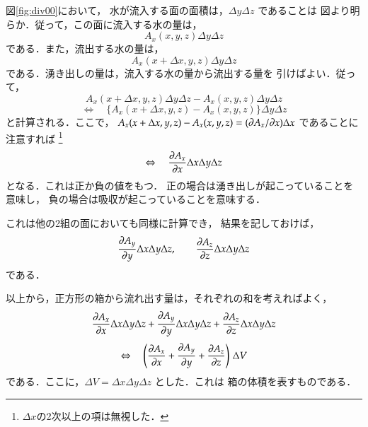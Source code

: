         図\ref{fig:div00}において，
        水が流入する面の面積は，$\Delta y\Delta z$ であることは
        図より明らか．従って，この面に流入する水の量は，
            \begin{equation*}
                A_{x}(x, y, z)\Delta y\Delta z
            \end{equation*}
        である．また，流出する水の量は，
            \begin{equation*}
                A_{x}(x+\Delta x, y, z)\Delta y\Delta z
            \end{equation*}
        である．湧き出しの量は，流入する水の量から流出する量を
        引けばよい．従って，
            \begin{equation*}
                A_{x}(x+\Delta x, y, z)\Delta y\Delta z-A_{x}(x, y, z)\Delta y\Delta z
            \end{equation*}
            \begin{equation*}
                \Leftrightarrow \quad \{ A_{x}(x+\Delta x, y, z)-A_{x}(x, y, z)\}\Delta y\Delta z
            \end{equation*}
        と計算される．ここで，
        $A_{x}(x+\Delta x, y, z)-A_{x}(x, y, z)=(\partial A_{x}/\partial x)\Delta x$ であることに
        注意すれば
            \footnote{
                $\Delta x$の2次以上の項は無視した．
            }
            \begin{equation*}
                \Leftrightarrow \quad  \frac{\partial A_{x}}{\partial x}\Delta x\Delta y\Delta z
            \end{equation*}
        となる．これは正か負の値をもつ．
        正の場合は湧き出しが起こっていることを意味し，
        負の場合は吸収が起こっていることを意味する．

        これは他の2組の面においても同様に計算でき，
        結果を記しておけば，
            \begin{equation*}
                \frac{\partial A_{y}}{\partial y}\Delta x\Delta y\Delta z, \qquad
                \frac{\partial A_{z}}{\partial z}\Delta x\Delta y\Delta z
            \end{equation*}
        である．

        以上から，正方形の箱から流れ出す量は，それぞれの和を考えればよく，
            \begin{equation*}
                \frac{\partial A_{x}}{\partial x}\Delta x\Delta y\Delta z
                +\frac{\partial A_{y}}{\partial y}\Delta x\Delta y\Delta z
                +\frac{\partial A_{z}}{\partial z}\Delta x\Delta y\Delta z
            \end{equation*}
            \begin{equation*}
                \Leftrightarrow \quad
                \left(
                \frac{\partial A_{x}}{\partial x}
                +\frac{\partial A_{y}}{\partial y}
                +\frac{\partial A_{z}}{\partial z}
                \right)
                \,\Delta V
            \end{equation*}
        である．ここに，$\Delta V=\Delta x\Delta y\Delta z$ とした．これは
        箱の体積を表すものである．

